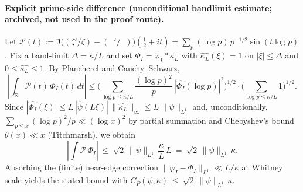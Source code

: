 \documentclass[11pt]{article}
\theoremstyle{definition}
\theoremstyle{remark}
\newcommand{\R}{\mathbb{R}}
\DeclareMathOperator{\dettwo}{det_2}
\begin{document}
\vspace{1.0cm}
\paragraph{Explicit prime-side difference (unconditional bandlimit estimate; archived, not used in the proof route).}
Let $\mathcal P(t):=\Im\big((\zeta'/\zeta)-(\dettwo'/\dettwo)\big)(\tfrac12+it)=\sum_{p}(\log p)\,p^{-1/2}\sin(t\log p)$. Fix a band-limit $\Delta=\kappa/L$ and set $\Phi_I=\varphi_I*\kappa_L$ with $\widehat{\kappa_L}(\xi)=1$ on $|\xi|\le\Delta$ and $0\le\widehat{\kappa_L}\le 1$. By Plancherel and Cauchy–Schwarz,
\[
 \left|\int_\R \!\mathcal P(t)\,\Phi_I(t)\,dt\right|
 \le \Bigg(\sum_{\log p\le \kappa/L}\frac{(\log p)^2}{p}\,|\widehat{\Phi_I}(\log p)|^2\Bigg)^{\!1/2}
 \cdot\Bigg(\sum_{\log p\le \kappa/L}1\Bigg)^{\!1/2}.
\]
Since $|\widehat{\Phi_I}(\xi)|\le L\,|\widehat{\psi}(L\xi)|\,\|\widehat{\kappa_L}\|_\infty\le L\,\|\psi\|_{L^1}$ and, unconditionally, $\sum_{p\le x}(\log p)^2/p\ll (\log x)^2$ by partial summation and Chebyshev's bound $\theta(x)\ll x$ (Titchmarsh), we obtain
\[
 \left|\int \!\mathcal P\,\Phi_I\right|\ \le\ \sqrt{2}\,\|\psi\|_{L^1}\,\frac{\kappa}{L}\,L\ =\ \sqrt{2}\,\|\psi\|_{L^1}\,\kappa.
\]
Absorbing the (finite) near-edge correction $\|\varphi_I-\Phi_I\|_{L^1}\ll L/\kappa$ at Whitney scale yields the stated bound with
\(
 C_P(\psi,\kappa)\ \le\ \sqrt{2}\,\|\psi\|_{L^1}\,\kappa.
 \)



 
\end{document}
